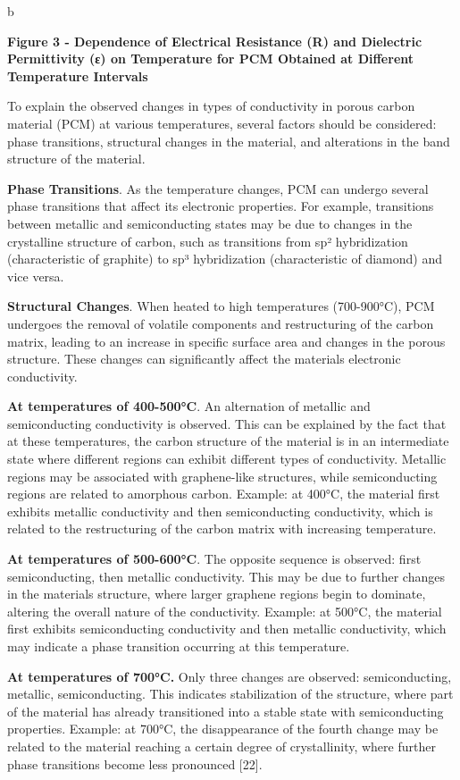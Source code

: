 b

{\bfseries Figure 3 - Dependence of Electrical Resistance (R) and
Dielectric Permittivity (ε) on Temperature for PCM Obtained at Different
Temperature Intervals}

To explain the observed changes in types of conductivity in porous
carbon material (PCM) at various temperatures, several factors should be
considered: phase transitions, structural changes in the material, and
alterations in the band structure of the material.

{\bfseries Phase Transitions}. As the temperature changes, PCM can undergo
several phase transitions that affect its electronic properties. For
example, transitions between metallic and semiconducting states may be
due to changes in the crystalline structure of carbon, such as
transitions from sp² hybridization (characteristic of graphite) to sp³
hybridization (characteristic of diamond) and vice versa.

{\bfseries Structural Changes}. When heated to high temperatures
(700-900°C), PCM undergoes the removal of volatile components and
restructuring of the carbon matrix, leading to an increase in specific
surface area and changes in the porous structure. These changes can
significantly affect the material\textquotesingle s electronic
conductivity.

{\bfseries At temperatures of 400-500°C}. An alternation of metallic and
semiconducting conductivity is observed. This can be explained by the
fact that at these temperatures, the carbon structure of the material is
in an intermediate state where different regions can exhibit different
types of conductivity. Metallic regions may be associated with
graphene-like structures, while semiconducting regions are related to
amorphous carbon. Example: at 400°C, the material first exhibits
metallic conductivity and then semiconducting conductivity, which is
related to the restructuring of the carbon matrix with increasing
temperature.

{\bfseries At temperatures of 500-600°C}. The opposite sequence is
observed: first semiconducting, then metallic conductivity. This may be
due to further changes in the material\textquotesingle s structure,
where larger graphene regions begin to dominate, altering the overall
nature of the conductivity. Example: at 500°C, the material first
exhibits semiconducting conductivity and then metallic conductivity,
which may indicate a phase transition occurring at this temperature.

{\bfseries At temperatures of 700°C.} Only three changes are observed:
semiconducting, metallic, semiconducting. This indicates stabilization
of the structure, where part of the material has already transitioned
into a stable state with semiconducting properties. Example: at 700°C,
the disappearance of the fourth change may be related to the material
reaching a certain degree of crystallinity, where further phase
transitions become less pronounced {[}22{]}.

